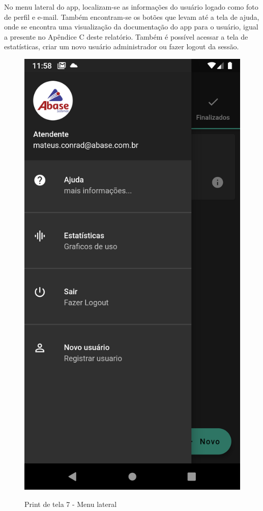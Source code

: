 No menu lateral do app, localizam-se as informações do usuário logado como foto de perfil e e-mail. Também encontram-se os botões que levam até a tela de ajuda, onde se encontra uma visualização da documentação do app para o usuário, igual a presente no Apêndice C deste relatório. Também é possível acessar a tela de estatísticas, criar um novo usuário administrador ou fazer logout da sessão.
\begin{figure}[htb]
     \caption{Print de tela 7 - Menu lateral}
     \centering
     \begin{frame}{
     \includegraphics [scale = 0.2]{img/screenshots/6_drawer.png}}
     \end{frame}
     \label{fig:6_drawer}
 \end{figure}
 \newpage
 
